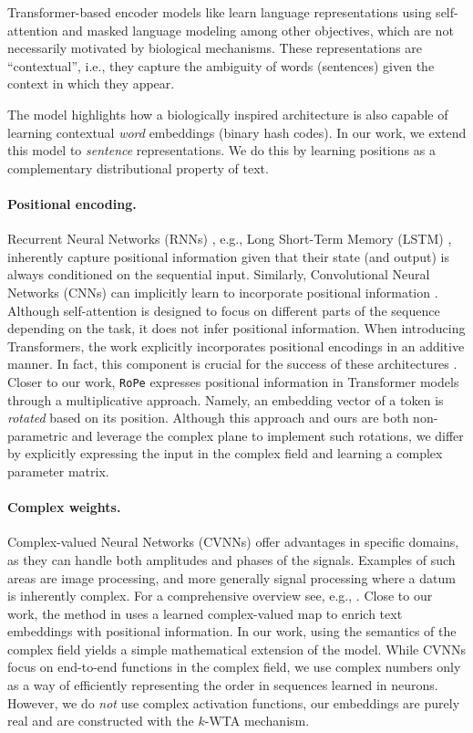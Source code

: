 Transformer-based encoder models like \bert learn language representations using self-attention and masked language modeling among other objectives, which are not necessarily motivated by biological mechanisms.
These representations are \enquote{contextual}, i.e., they capture the ambiguity of words (sentences) given the context in which they appear.

The \flyvec model highlights how a biologically inspired architecture is also capable of learning contextual \textit{word} embeddings (binary hash codes).
In our work, we extend this model to \textit{sentence} representations.
We do this by learning positions as a complementary distributional property of text. 

\paragraph{Positional encoding.}
Recurrent Neural Networks (RNNs) \cite{rnn}, e.g., Long Short-Term Memory (LSTM) \cite{lstm, gers}, inherently capture positional information given that their state (and output) is always conditioned on the sequential input.
Similarly, Convolutional Neural Networks (CNNs) can implicitly learn to incorporate positional information \cite{cnn_position}.
Although self-attention \cite{attention} is designed to focus on different parts of the sequence depending on the task, it does not infer positional information.
When introducing Transformers, the work \cite{vaswani} explicitly incorporates positional encodings in an additive manner.
In fact, this component is crucial for the success of these architectures \cite{pos-information-crucial}.
Closer to our work, \texttt{RoPe} \cite{roformer} expresses positional information in Transformer models through a multiplicative approach.
Namely, an embedding vector of a token is \textit{rotated} based on its position.
Although this approach and ours are both non-parametric and leverage the complex plane to implement such rotations, we differ by explicitly expressing the input in the complex field and learning a complex parameter matrix.

\paragraph{Complex weights.}
Complex-valued Neural Networks (CVNNs) offer advantages in specific domains, as they can handle both amplitudes and phases of the signals.
Examples of such areas are image processing, and more generally signal processing where a datum is inherently complex.
For a comprehensive overview see, e.g., \cite{cvnn-survey}.
Close to our work, the method in \cite{complex_embeddings} uses a learned complex-valued map to enrich text embeddings with positional information.
In our work, using the semantics of the complex field yields a simple mathematical extension of the \flyvec model.
While CVNNs focus on end-to-end functions in the complex field, we use complex numbers only as a way of efficiently representing the order in sequences learned in neurons.
However, we do \textit{not} use complex activation functions, our embeddings are purely real and are constructed with the $k$-WTA mechanism.